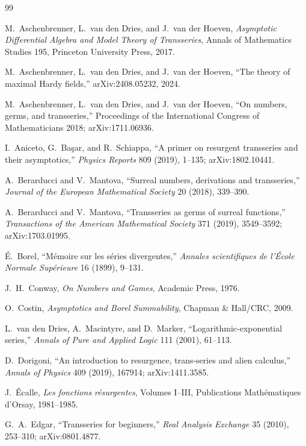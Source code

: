 \documentclass[11pt,oneside,openany]{book}
\theoremstyle{plain}
\theoremstyle{definition}
\theoremstyle{remark}
\begin{document}
\begin{thebibliography}{99}

M.~Aschenbrenner, L.~van den Dries, and J.~van der Hoeven,
\emph{Asymptotic Differential Algebra and Model Theory of Transseries},
Annals of Mathematics Studies 195, Princeton University Press, 2017.

M.~Aschenbrenner, L.~van den Dries, and J.~van der Hoeven,
``The theory of maximal Hardy fields,''
arXiv:2408.05232, 2024.

M.~Aschenbrenner, L.~van den Dries, and J.~van der Hoeven,
``On numbers, germs, and transseries,''
Proceedings of the International Congress of Mathematicians 2018;
arXiv:1711.06936.

I.~Aniceto, G.~Başar, and R.~Schiappa,
``A primer on resurgent transseries and their asymptotics,''
\emph{Physics Reports} 809 (2019), 1--135;
arXiv:1802.10441.

A.~Berarducci and V.~Mantova,
``Surreal numbers, derivations and transseries,''
\emph{Journal of the European Mathematical Society} 20 (2018), 339--390.

A.~Berarducci and V.~Mantova,
``Transseries as germs of surreal functions,''
\emph{Transactions of the American Mathematical Society} 371 (2019), 3549--3592;
arXiv:1703.01995.

É.~Borel,
``Mémoire sur les séries divergentes,''
\emph{Annales scientifiques de l'École Normale Supérieure} 16 (1899), 9--131.

J.~H.~Conway,
\emph{On Numbers and Games},
Academic Press, 1976.

O.~Costin,
\emph{Asymptotics and Borel Summability},
Chapman \& Hall/CRC, 2009.

L.~van den Dries, A.~Macintyre, and D.~Marker,
``Logarithmic-exponential series,''
\emph{Annals of Pure and Applied Logic} 111 (2001), 61--113.

D.~Dorigoni,
``An introduction to resurgence, trans-series and alien calculus,''
\emph{Annals of Physics} 409 (2019), 167914;
arXiv:1411.3585.

J.~Écalle,
\emph{Les fonctions résurgentes}, Volumes I--III,
Publications Mathématiques d'Orsay, 1981--1985.

G.~A.~Edgar,
``Transseries for beginners,''
\emph{Real Analysis Exchange} 35 (2010), 253--310;
arXiv:0801.4877.


\end{thebibliography}
\end{document}

